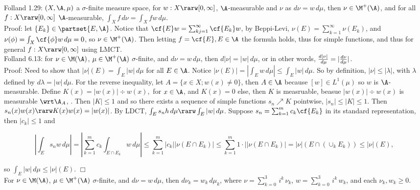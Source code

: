 \break

Folland 1.29: $(X ,\A, \mu)$ a $\sigma$-finite measure space, for $w: X \rarw [0,\infty]$, $\A$-measurable and $\nu$ as $d\nu = w \, d\mu $, then $\nu \in \M^+(\A)$, and for all $f:X \rarw [0, \infty]$ $\A$-measurable, $\int_X f\, d\nu = \int_X fw \, d\mu$. \\

\noindent
Proof: let $\{E_k\} \in \partset{E, \A}$. Notice that $\cf{E} w = \sum_{kj=1}^\infty \cf{E_k} w$, by Beppi-Levi, $\nu(E) = \sum_{k=1}^\infty \nu(E_k)$, and $\nu(\phi) = \int_X \cf{\phi} w \, d\mu = 0$, so $\nu \in \M^+(\A)$. Then letting $f = \cf{E}, E \in \A$ the formula  holds, thus for simple functions, and thus for general $f:X \rarw [0, \infty]$ using LMCT.\\



Folland 6.13: for $\nu \in \M(\A)$, $\mu \in \M^+(\A)$ $\sigma$-finite, and $d\nu = w \, d\mu$, then $d|\nu| = |w| \, d\mu$, or in other words, $\frac{d|\nu|}{\\d\mu} = |\frac{d\nu}{d\mu}|$. \\

\noindent
Proof: Need to show that $|\nu|(E) = \int_E |w| \, d\mu$ for all $E \in \A$. Notice $|\nu(E)| = |\int_E w \, d\mu| \le \int_E |w| \, d\mu$. So by definition, $|\nu| \le |\lambda|$, with $\lambda$ defined by $d\lambda = |w| \, d\mu$. For the reverse inequality, let $A = \{x \in X; w(x) \not = 0 \}$, then $A \in \A$ because $[w] \in L^1(\mu)$ so $w$ is $\A$-measurable. Define $K(x) = |w(x)| \div w(x),$ for $x \in \A$, and $K(x) = 0$ else, then $K$ is measruable, beasue $ |w(x)| \div w(x) $ is measurable $\wrt \A_A$, . Then $|K| \le 1$ and so there exists a sequence of simple functions $s_n \nearrow K$ pointwise, $|s_n| \le |K| \le 1$. Then $s_n(x) w(x) \rarw K(x) w(x) = |w(x)|$. By LDCT, $\int_E s_n h \, d\mu \rarw \int_E |w| \, d\mu$. Suppose $s_n = \sum_{k=1}^m c_k \cf{E_k}$ in its standard representation, then $|c_k| \le 1$ and 

$$
|\int_E s_n w \, d\mu | = |\sum_{k=1}^m c_k \int_{E \cap E_k} w \, d\mu| \le \sum_{k=1}^m |c_k| |\nu(E \cap E_k)|  \le \sum_{k=1}^m 1 \cdot| |\nu(E \cap E_k)| = |\nu|(E \cap (\cup_k E_k)) \le |\nu|(E),
$$

\noindent
so $\int_E |w| \, d\mu \le |\nu|(E)$. $\Box$\\

For $\nu \in \M(\A)$, $\mu \in \M^+(\A)$ $\sigma$-finite, and $d\nu = w \, d\mu$, then $d\nu_k = w_k \, d\mu_k$, where $\nu = \sum_{k=0}^3 \, i^k \, \nu_k$, $w = \sum_{k=0}^3 \, i^k \, w_k$, and each $\nu_k , w_k \ge 0$. \\

